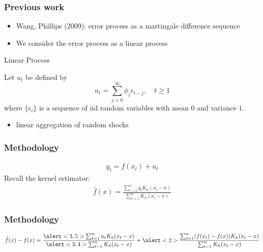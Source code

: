 \documentclass{beamer}
\begin{document}
\begin{frame}[c]\frametitle{Previous work}
  \begin{itemize}[<+->]
    \item Wang, Phillips (2009): error process as a \alert{martingale difference sequence}
    \item We consider the error process as a \alert{linear process} 
  \end{itemize}
\end{frame}

\begin{frame}[t]{Linear Process}
  \begin{definition}
    Let $u_t$ be defined by \[ u_t = \sum_{j=0}^{\infty} \phi_j \epsilon_{t-j}, \quad t \geq 1 \] where $\{\epsilon_i\}$ is a sequence of iid random variables with mean $0$ and variance $1$.
  \end{definition}
  \begin{itemize}
    \item<2-> linear aggregation of random shocks
  \end{itemize}
\end{frame}

\begin{frame}[c]\frametitle{Methodology}
  \begin{align*}
    y_t = f(x_t) + u_t
  \end{align*}
  Recall the kernel estimator:
  \begin{align*}
    \hat{f}(x) = \frac{\sum_{t=1}^{n} y_t K_h(x_t-x)}{\sum_{t=1}^{n} K_h(x_t-x)} 
  \end{align*}
\end{frame}
\begin{frame}[c]\frametitle{Methodology}
  \begin{equation*}
    \hat{f}(x) - f(x) = \frac{\alert<3,5>{\sum_{t=1}^n u_t K_h(x_t - x)}}{\alert<3,4>{\sum_{t=1}^n K_h(x_t - x)}} + \alert<2>{\frac{\sum_{t=1}^n (f(x_t)-f(x)) K_h(x_t - x)}{\sum_{t=1}^n K_h(x_t - x)}}
  \end{equation*}
\end{frame}


\end{document}
